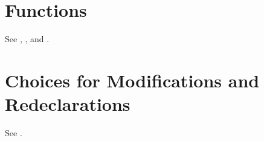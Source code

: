 \section{Functions}\label{annotations-for-functions}

See , , and .


\section{Choices for Modifications and Redeclarations}\label{annotation-choices-for-modifications-and-redeclarations}\label{choices-for-modifications-and-redeclarations}

See .

